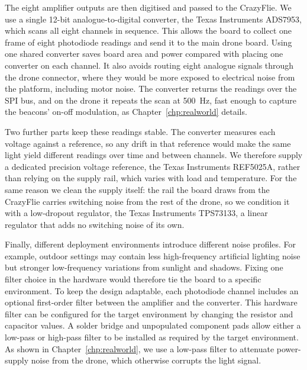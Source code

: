 The eight amplifier outputs are then digitised and passed to the CrazyFlie. We use a single 12-bit analogue-to-digital converter, the Texas Instruments ADS7953, which scans all eight channels in sequence. This allows the board to collect one frame of eight photodiode readings and send it to the main drone board. Using one shared converter saves board area and power compared with placing one converter on each channel. It also avoids routing eight analogue signals through the drone connector, where they would be more exposed to electrical noise from the platform, including motor noise. The converter returns the readings over the SPI bus, and on the drone it repeats the scan at 500~Hz, fast enough to capture the beacons' on-off modulation, as Chapter~\ref{chp:realworld} details.


Two further parts keep these readings stable. The converter measures each voltage against a reference, so any drift in that reference would make the same light yield different readings over time and between channels. We therefore supply a dedicated precision voltage reference, the Texas Instruments REF5025A, rather than relying on the supply rail, which varies with load and temperature. For the same reason we clean the supply itself: the rail the board draws from the CrazyFlie carries switching noise from the rest of the drone, so we condition it with a low-dropout regulator, the Texas Instruments TPS73133, a linear regulator that adds no switching noise of its own.

Finally, different deployment environments introduce different noise profiles. For example, outdoor settings may contain less high-frequency artificial lighting noise but stronger low-frequency variations from sunlight and shadows. Fixing one filter choice in the hardware would therefore tie the board to a specific environment. To keep the design adaptable, each photodiode channel includes an optional first-order filter between the amplifier and the converter. This hardware filter can be configured for the target environment by changing the resistor and capacitor values. A solder bridge and unpopulated component pads allow either a low-pass or high-pass filter to be installed as required by the target environment. As shown in Chapter~\ref{chp:realworld}, we use a low-pass filter to attenuate power-supply noise from the drone, which otherwise corrupts the light signal.



